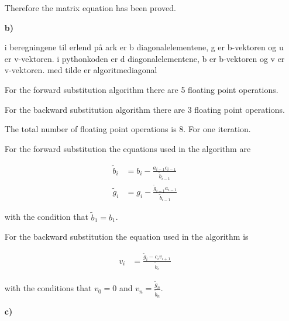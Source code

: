 \documentclass{article}
\newcounter{excount}
\newenvironment{exercise}[1][]{\addtocounter{excount}{1} \noindent {\bf Exercise
\arabic{excount} \ \ #1}\hspace{2mm}}{\vspace{4mm}}
\begin{document}
\begin{exercise}
\begin{itemize}
        Therefore the matrix equation has been proved.


\vspace{1cm}

    \item [\bf b)]

      i beregningene til erlend på ark er b diagonalelementene, g er b-vektoren og u er v-vektoren. i pythonkoden er d diagonalelementene, b er b-vektoren og v er v-vektoren. med tilde er algoritmediagonal

      For the forward substitution algorithm there are 5 floating point operations.

      For the backward substitution algorithm there are 3 floating point operations.

      The total number of floating point operations is 8. For one iteration.

      For the forward substitution the equations used in the algorithm are

      \begin{align*}
          \tilde{b}_i &= b_i - \frac{a_{i-1} c_{i-1}}{\tilde{b} _{i-1}} \\
          \tilde{g}_i &= g_i - \frac{\tilde{g}_{i-1} a_{i-1}}{\tilde{b}_{i-1}}
      \end{align*}

      with the condition that $\tilde{b}_1 = b_1$.

      For the backward substitution the equation used in the algorithm is

      \begin{align*}
          v_i &= \frac{\tilde{g}_i - c_i v_{i+1}}{\tilde{b}_i}
      \end{align*}

      with the conditions that $v_0 = 0$ and $v_n = \frac{\tilde{g}_n}{\tilde{b}_n}$. 





\vspace{1cm}

    \item [\bf c)]








\vspace{1cm}


\end{itemize}
\end{exercise}
\end{document}
